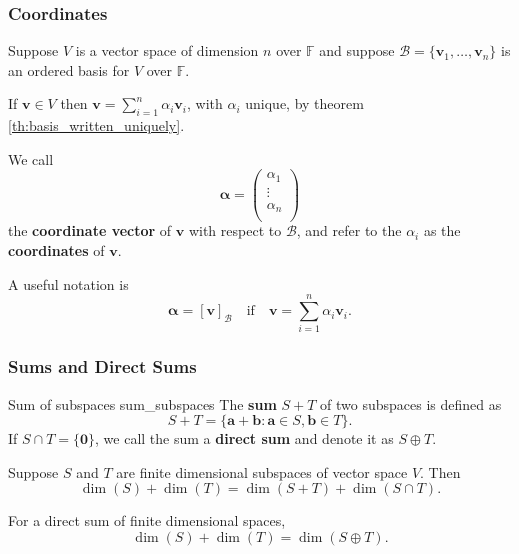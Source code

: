 \subsubsection{Coordinates}

\begin{definition}{\cite{math2601_notes}}{}
	Suppose $V$ is a vector space of dimension $n$ over $\mathbb{F}$ and suppose $\mathcal{B} = \{ \mathbf{v}_1, \ldots, \mathbf{v}_n \}$ is an ordered basis for $V$ over $\mathbb{F}$.

	If $\mathbf{v} \in V$ then $\mathbf{v} = \sum_{i = 1}^{n} \alpha_i \mathbf{v}_i$, with $\alpha_i$ unique, by theorem \ref{th:basis_written_uniquely}.

	We call
	$$ \boldsymbol{\alpha} = 
		\begin{pmatrix}
			\alpha_1 \\
			\vdots \\
			\alpha_n \\
		\end{pmatrix}
	$$
	the \textbf{coordinate vector} of $\mathbf{v}$ with respect to $\mathcal{B}$, and refer to the $\alpha_i$ as the \textbf{coordinates} of $\mathbf{v}$.
\end{definition}

A useful notation is
$$ \boldsymbol{\alpha} = [\mathbf{v}]_\mathcal{B} \quad
	\text{if} \quad \mathbf{v} = \sum_{i = 1}^{n} \alpha_i \mathbf{v}_i . $$

\subsubsection{Sums and Direct Sums}

\begin{definition}{Sum of subspaces \cite{math2601_notes}}{sum_subspaces}
	The \textbf{sum} $S + T$ of two subspaces is defined as
	$$ S + T = \{ \mathbf{a} + \mathbf{b} : \mathbf{a} \in S, \mathbf{b} \in T \} . $$
	If $S \cap T = \{ \mathbf{0} \}$, we call the sum a \textbf{direct sum} and denote it as $S \oplus T$.
\end{definition}

\begin{theorem}{\cite{math2601_notes}}{}
	Suppose $S$ and $T$ are finite dimensional subspaces of vector space $V$. Then
	$$ \dim (S) + \dim (T) = \dim (S + T) + \dim (S \cap T) . $$
\end{theorem}

\begin{corollary}{\cite{math2601_notes}}{}
	For a direct sum of finite dimensional spaces,
	$$ \dim (S) + \dim (T) = \dim (S \oplus T) . $$
\end{corollary}

